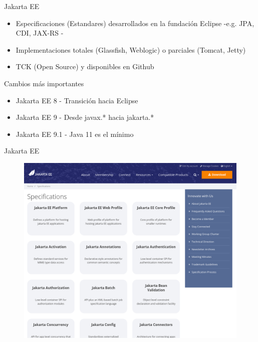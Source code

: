 \documentclass[aspectratio=169]{beamer}
\begin{document}
\begin{frame}{Jakarta EE}
\begin{itemize}
\item Especificaciones (Estandares) desarrollados en la fundación Eclipse -e.g. JPA, CDI, JAX-RS -
\item Implementaciones totales (Glassfish, Weblogic) o parciales (Tomcat, Jetty)
\item TCK (Open Source) y disponibles en Github
\end{itemize}

Cambios más importantes

\begin{itemize}
\item Jakarta EE 8 - Transición hacia Eclipse
\item Jakarta EE 9 - Desde javax.* hacia jakarta.*
\item Jakarta EE 9.1 - Java 11 es el mínimo
\end{itemize}
\end{frame}

\begin{frame}{Jakarta EE}
\begin{figure}
	\centering
	\includegraphics[width=0.7\linewidth]{Images/jakartaeespecs}
\end{figure}
\end{frame}
\end{document}

